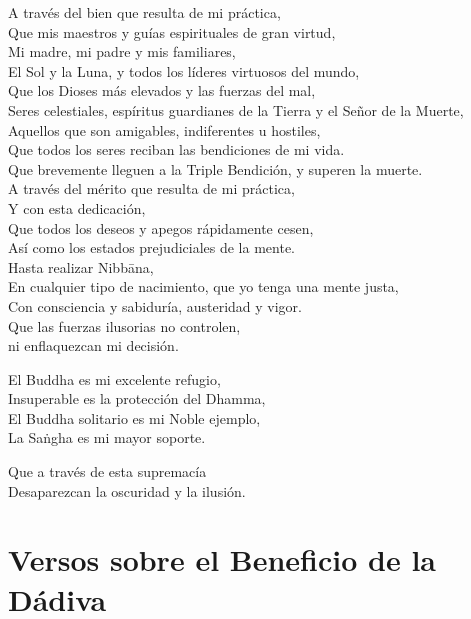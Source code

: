 A través del bien que resulta de mi práctica,\\
Que mis maestros y guías espirituales de gran virtud,\\
Mi madre, mi padre y mis familiares,\\
El Sol y la Luna, y todos los líderes virtuosos del mundo,\\
Que los Dioses más elevados y las fuerzas del mal,\\
Seres celestiales, espíritus guardianes de la Tierra y el Señor de la Muerte,\\
Aquellos que son amigables, indiferentes u hostiles,\\
Que todos los seres reciban las bendiciones de mi vida.\\
Que brevemente lleguen a la Triple Bendición, y superen la muerte.\\
A través del mérito que resulta de mi práctica,\\
Y con esta dedicación,\\
Que todos los deseos y apegos rápidamente cesen,\\
Así como los estados prejudiciales de la mente.\\
Hasta realizar Nibbāna,\\
En cualquier tipo de nacimiento, que yo tenga una mente justa,\\
Con consciencia y sabiduría, austeridad y vigor.\\
Que las fuerzas ilusorias no controlen,\\
ni enflaquezcan mi decisión.

El Buddha es mi excelente refugio,\\
Insuperable es la protección del Dhamma,\\
El Buddha solitario es mi Noble ejemplo,\\
La Saṅgha es mi mayor soporte.

Que a través de esta supremacía\\
Desaparezcan la oscuridad y la ilusión.

\chapter[Beneficio de la Dádiva]{Versos sobre el Beneficio de la Dádiva}


\begin{leader}
\end{leader}

